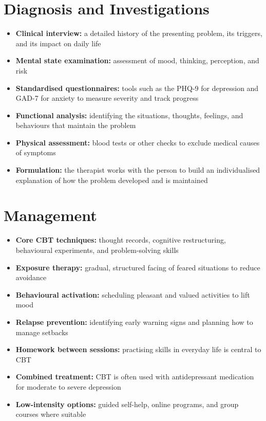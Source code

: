 \section*{Diagnosis and Investigations}
\begin{itemize}
    \item \textbf{Clinical interview:} a detailed history of the presenting problem, its triggers, and its impact on daily life
    \item \textbf{Mental state examination:} assessment of mood, thinking, perception, and risk
    \item \textbf{Standardised questionnaires:} tools such as the PHQ-9 for depression and GAD-7 for anxiety to measure severity and track progress
    \item \textbf{Functional analysis:} identifying the situations, thoughts, feelings, and behaviours that maintain the problem
    \item \textbf{Physical assessment:} blood tests or other checks to exclude medical causes of symptoms
    \item \textbf{Formulation:} the therapist works with the person to build an individualised explanation of how the problem developed and is maintained
\end{itemize}

\section*{Management}
\begin{itemize}
    \item \textbf{Core CBT techniques:} thought records, cognitive restructuring, behavioural experiments, and problem-solving skills
    \item \textbf{Exposure therapy:} gradual, structured facing of feared situations to reduce avoidance
    \item \textbf{Behavioural activation:} scheduling pleasant and valued activities to lift mood
    \item \textbf{Relapse prevention:} identifying early warning signs and planning how to manage setbacks
    \item \textbf{Homework between sessions:} practising skills in everyday life is central to CBT
    \item \textbf{Combined treatment:} CBT is often used with antidepressant medication for moderate to severe depression
    \item \textbf{Low-intensity options:} guided self-help, online programs, and group courses where suitable
\end{itemize}

